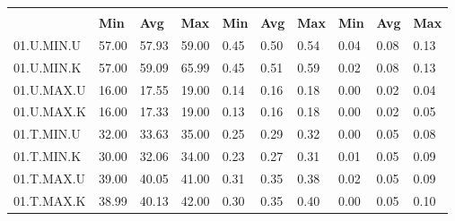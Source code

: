 \begin{tabular}{|>{\raggedright}p{}|>{\raggedright}p{}|>{\raggedright}p{}|>{\raggedright}p{}|>{\raggedright}p{}|>{\raggedright}p{}|>{\raggedright}p{}|>{\raggedright}p{}|>{\raggedright}p{}|>{\raggedright}p{}|}
\hline 
\multirow{2}{0.12\columnwidth}{\textbf{\footnotesize{}Bezeichnung}} & \multicolumn{3}{l|}{\textbf{\footnotesize{}CPU-Last {[}\%{]}}} & \multicolumn{3}{l|}{\textbf{\footnotesize{}Systemtime {[}s{]}}} & \multicolumn{3}{l|}{\textbf{\footnotesize{}Usertime {[}s{]}}}\tabularnewline
\cline{2-10} 
& \textbf{\footnotesize{}Min} & \textbf{\footnotesize{}Avg} & \textbf{\footnotesize{}Max} & \textbf{\footnotesize{}Min} & \textbf{\footnotesize{}Avg} & \textbf{\footnotesize{}Max} & \textbf{\footnotesize{}Min} & \textbf{\footnotesize{}Avg} & \textbf{\footnotesize{}Max}\tabularnewline
\hline 
\hline 
{\footnotesize{}01.U.MIN.U} & {\footnotesize{}57.00} & {\footnotesize{}57.93} & {\footnotesize{}59.00} & {\footnotesize{}0.45} & {\footnotesize{}0.50} & {\footnotesize{}0.54} & {\footnotesize{}0.04} & {\footnotesize{}0.08} & {\footnotesize{}0.13}\tabularnewline
\hline 
\hline 
{\footnotesize{}01.U.MIN.K} & {\footnotesize{}57.00} & {\footnotesize{}59.09} & {\footnotesize{}65.99} & {\footnotesize{}0.45} & {\footnotesize{}0.51} & {\footnotesize{}0.59} & {\footnotesize{}0.02} & {\footnotesize{}0.08} & {\footnotesize{}0.13}\tabularnewline
\hline 
\hline 
{\footnotesize{}01.U.MAX.U} & {\footnotesize{}16.00} & {\footnotesize{}17.55} & {\footnotesize{}19.00} & {\footnotesize{}0.14} & {\footnotesize{}0.16} & {\footnotesize{}0.18} & {\footnotesize{}0.00} & {\footnotesize{}0.02} & {\footnotesize{}0.04}\tabularnewline
\hline 
\hline 
{\footnotesize{}01.U.MAX.K} & {\footnotesize{}16.00} & {\footnotesize{}17.33} & {\footnotesize{}19.00} & {\footnotesize{}0.13} & {\footnotesize{}0.16} & {\footnotesize{}0.18} & {\footnotesize{}0.00} & {\footnotesize{}0.02} & {\footnotesize{}0.05}\tabularnewline
\hline 
\hline 
{\footnotesize{}01.T.MIN.U} & {\footnotesize{}32.00} & {\footnotesize{}33.63} & {\footnotesize{}35.00} & {\footnotesize{}0.25} & {\footnotesize{}0.29} & {\footnotesize{}0.32} & {\footnotesize{}0.00} & {\footnotesize{}0.05} & {\footnotesize{}0.08}\tabularnewline
\hline 
\hline 
{\footnotesize{}01.T.MIN.K} & {\footnotesize{}30.00} & {\footnotesize{}32.06} & {\footnotesize{}34.00} & {\footnotesize{}0.23} & {\footnotesize{}0.27} & {\footnotesize{}0.31} & {\footnotesize{}0.01} & {\footnotesize{}0.05} & {\footnotesize{}0.09}\tabularnewline
\hline 
\hline 
{\footnotesize{}01.T.MAX.U} & {\footnotesize{}39.00} & {\footnotesize{}40.05} & {\footnotesize{}41.00} & {\footnotesize{}0.31} & {\footnotesize{}0.35} & {\footnotesize{}0.38} & {\footnotesize{}0.02} & {\footnotesize{}0.05} & {\footnotesize{}0.09}\tabularnewline
\hline 
\hline 
{\footnotesize{}01.T.MAX.K} & {\footnotesize{}38.99} & {\footnotesize{}40.13} & {\footnotesize{}42.00} & {\footnotesize{}0.30} & {\footnotesize{}0.35} & {\footnotesize{}0.40} & {\footnotesize{}0.00} & {\footnotesize{}0.05} & {\footnotesize{}0.10}\tabularnewline
\hline 
\end{tabular}
\par

